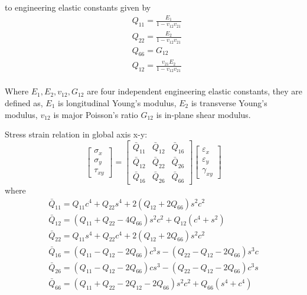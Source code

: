 \documentclass[USenglish]{article}
\begin{document}
to engineering elastic constants given by
\begin{equation}
    \begin{split}
    &Q_{11}=\frac{E_1}{1-v_{12}v_{21}}\\
    &Q_{22}=\frac{E_2}{1-v_{12}v_{21}}\\
    &Q_{66}=G_{12}\\
    &Q_{12}=\frac{v_{21}E_2}{1-v_{12}v_{21}}\\
    \end{split}
\end{equation}

Where $E_1, E_2, v_{12}, G_{12} $  are four independent engineering elastic constants, they are defined as, $E_1 $  is  longitudinal Young's modulus, $E_2 $  is transverse Young's modulus, $v_{12} $ is  major Poisson's ratio $G_{12} $ is in-plane shear modulus.

Stress strain relation in global axis x-y:
\begin{equation}\left[\begin{array}{l}\sigma _{x} \\ \sigma _{y} \\ \tau_{xy}\end{array}\right]=\left[\begin{array}{lll}\bar{Q}_{11} & \bar{Q}_{12} & \bar{Q}_{16}\\ \bar{Q}_{12} & \bar{Q}_{22} & \bar{Q}_{26} \\ \bar{Q}_{16} & \bar{Q}_{26} &\bar{Q}_{66}\end{array}\right]\left[\begin{array}{l}\varepsilon_{x} \\ \varepsilon_{y}\\ \gamma_{x y}\end{array}\right]
\end{equation}
where
\begin{equation}\begin{array}{l}\bar{Q}_{11}=Q_{11} c^{4}+Q_{22} s^{4}+2\left(Q_{12}+2 Q_{66}\right) s^{2} c^{2}\\ \bar{Q}_{12}=\left(Q_{11}+Q_{22}-4 Q_{66}\right) s^{2} c^{2}+Q_{12}\left(c^{4}+s^{2}\right)\\ \bar{Q}_{22}=Q_{11} s^{4}+Q_{22} c^{4}+2\left(Q_{12}+2 Q_{66}\right) s^{2} c^{2} \\\bar{Q}_{16}=\left(Q_{11}-Q_{12}-2 Q_{66}\right) c^{3} s-\left(Q_{22}-Q_{12}-2Q_{66}\right) s^{3} c \\ \bar{Q}_{26}=\left(Q_{11}-Q_{12}-2 Q_{66}\right) c s^{3}-\left(Q_{22}-Q_{12}-2 Q_{66}\right)c^{3} s \\ \bar{Q}_{66}=\left(Q_{11}+Q_{22}-2 Q_{12}-2 Q_{66}\right) s^{2}c^{2}+Q_{66}\left(s^{4}+c^{4}\right)\\\end{array}
\end{equation}
\end{document}
